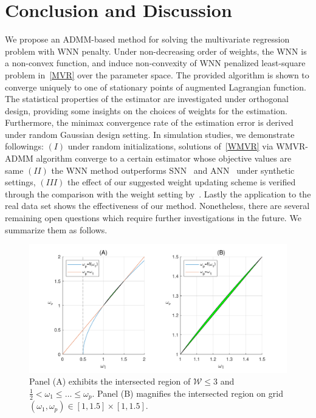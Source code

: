 \documentclass[alpha-refs]{wiley-article}
\begin{document}
\section{Conclusion and Discussion} \label{Disc}
We propose an ADMM-based method for solving the multivariate regression problem with WNN penalty.
Under non-decreasing order of weights, the WNN is a non-convex function, and induce non-convexity of WNN penalized least-square 
problem in~\eqref{MVR} over the parameter space.
The provided algorithm is shown to converge uniquely to one of stationary points of augmented Lagrangian function. 
The statistical properties of the estimator are investigated under orthogonal design, providing some insights on the choices of weights for the estimation.
Furthermore, the minimax convergence rate of the estimation error is derived under random Gaussian design setting.
In simulation studies, we demonstrate followings: 
$(I)$  under random initializations, solutions of~\eqref{WMVR} via WMVR-ADMM algorithm converge to a certain estimator whose objective values are same
$(II)$ the WNN method outperforms SNN~\citep{yuan2007dimension} and ANN~\citep{chen2013reduced} under synthetic settings,
$(III)$ the effect of our suggested weight updating scheme is verified through the comparison with the weight setting by~\citet{chen2013reduced}.
Lastly the application to the real data set shows the effectiveness of our method. 
Nonetheless, there are several remaining open questions which require further investigations in the future.
We summarize them as follows.
\begin{figure} [t!]
  \includegraphics[width=130mm]{Figure/Fig3.pdf}
  \centering
  \caption{ Panel (A) exhibits the intersected region of $\mathcal{W} \leq 3$ and $\frac{1}{2} < \omega_{1} \leq \dots \leq \omega_{p}$. Panel (B) magnifies the intersected region on grid $(\omega_{1},\omega_{p})\in[1,1.5] \times [1,1.5]$. }
  \label{Fig6}
\end{figure}
\end{document}
